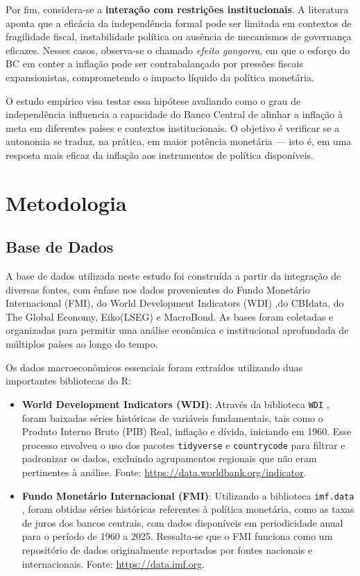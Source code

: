 \documentclass[a4paper,12pt]{article}
\begin{document}
Por fim, considera-se a \textbf{interação com restrições institucionais}. A literatura aponta que a eficácia da independência formal pode ser limitada em contextos de fragilidade fiscal, instabilidade política ou ausência de mecanismos de governança eficazes. Nesses casos, observa-se o chamado \emph{efeito gangorra}, em que o esforço do BC em conter a inflação pode ser contrabalançado por pressões fiscais expansionistas, comprometendo o impacto líquido da política monetária.

O estudo empírico visa testar essa hipótese avaliando como o grau de independência influencia a capacidade do Banco Central de alinhar a inflação à meta em diferentes países e contextos institucionais. O objetivo é verificar se a autonomia se traduz, na prática, em maior potência monetária — isto é, em uma resposta mais eficaz da inflação aos instrumentos de política disponíveis.


\section*{\textbf{Metodologia}}

\subsection*{\textbf{Base de Dados}}

A base de dados utilizada neste estudo foi construída a partir da integração de diversas fontes, com ênfase nos dados provenientes do Fundo Monetário Internacional (FMI), do World Development Indicators (WDI) ,do CBIdata, do The Global Economy, Eiko(LSEG) e MacroBond. As bases foram coletadas e organizadas para permitir uma análise econômica e institucional aprofundada de múltiplos países ao longo do tempo.

Os dados macroeconômicos essenciais foram extraídos utilizando duas importantes bibliotecas do R:
\begin{itemize}
    \item \textbf{World Development Indicators (WDI)}: Através da biblioteca \texttt{WDI} \cite{WDI}, foram baixadas séries históricas de variáveis fundamentais, tais como o Produto Interno Bruto (PIB) Real, inflação e dívida, iniciando em 1960. Esse processo envolveu o uso dos pacotes \texttt{tidyverse} \cite{tidyverse} e \texttt{countrycode} \cite{countrycode} para filtrar e padronizar os dados, excluindo agrupamentos regionais que não eram pertinentes à análise. Fonte: \url{https://data.worldbank.org/indicator}.
    \item \textbf{Fundo Monetário Internacional (FMI)}: Utilizando a biblioteca \texttt{imf.data} \cite{imf.data}, foram obtidas séries históricas referentes à política monetária, como as taxas de juros dos bancos centrais, com dados disponíveis em periodicidade anual para o período de 1960 a 2025. Ressalta-se que o FMI funciona como um repositório de dados originalmente reportados por fontes nacionais e internacionais. Fonte: \url{https://data.imf.org}.
\end{itemize}
\end{document}
